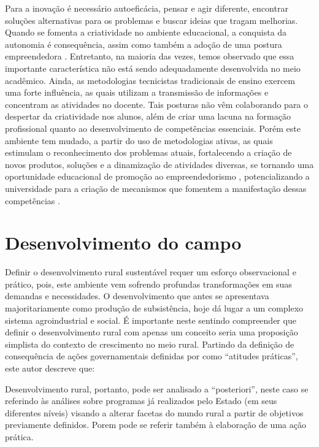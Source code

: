 Para a inovação é necessário autoeficácia, pensar e agir diferente, encontrar soluções alternativas para os problemas e buscar ideias que tragam melhorias. Quando se fomenta a criatividade no ambiente educacional, a conquista da autonomia é consequência, assim como também a adoção de uma postura empreendedora \cite{gonzalez_predictors_2009}. Entretanto, na maioria das vezes, temos observado que essa importante característica não está sendo adequadamente desenvolvida no meio acadêmico. Ainda, as metodologias tecnicistas tradicionais de ensino exercem uma forte influência, as quais utilizam a transmissão de informações e concentram as atividades no docente. Tais posturas não vêm colaborando para o despertar da criatividade nos alunos, além de criar uma lacuna na formação profissional quanto ao desenvolvimento de competências essenciais. Porém este ambiente tem mudado, a partir do uso de metodologias ativas, as quais estimulam o reconhecimento dos problemas atuais, fortalecendo a criação de novos produtos, soluções e a dinamização de atividades diversas, se tornando uma oportunidade educacional de promoção ao empreendedorismo \cite{faria_promocao_2018}, potencializando a universidade para a criação de mecanismos que fomentem a manifestação dessas competências \cite{audy_innovation_2006}.

\section{Desenvolvimento do campo}

Definir o desenvolvimento rural sustentável requer um esforço observacional e prático, pois, este ambiente vem sofrendo profundas transformações em suas demandas e necessidades. O desenvolvimento que antes se apresentava majoritariamente como produção de subsistência, hoje dá lugar a um complexo sistema agroindustrial \cite{bastos_determinantes_2018} e social. É importante neste sentindo compreender que definir o desenvolvimento rural com apenas um conceito seria uma proposição simplista do contexto de crescimento no meio rural. Partindo da definição de consequência de ações governamentais definidas por  como “atitudes práticas”, este autor descreve que:

\begin{citacao}
[...] Desenvolvimento rural, portanto, pode ser analisado a “posteriori”, neste caso se referindo às análises sobre programas já realizados pelo Estado (em seus diferentes níveis) visando a alterar facetas do mundo rural a partir de objetivos previamente definidos. Porem pode se referir também à elaboração de uma ação prática.
\end{citacao}

